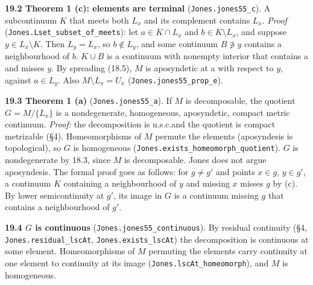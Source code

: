 \documentclass[11pt]{article}
\newcommand{\lean}[1]{\texttt{#1}}
\begin{document}
\textbf{19.2 Theorem 1 (c): elements are terminal} (\lean{Jones.\hspace{0pt}jones55\_\hspace{0pt}c}). A subcontinuum $K$ that meets both $L_x$ and its complement contains $L_x$. \emph{Proof} (\lean{Jones.\hspace{0pt}Lset\_\hspace{0pt}subset\_\hspace{0pt}of\_\hspace{0pt}meets}): let $a \in K \cap L_x$ and $b \in K \setminus L_x$, and suppose $y \in L_x \setminus K$. Then $L_y = L_x$, so $b \notin L_y$, and some continuum $B \not\ni y$ contains a neighbourhood of $b$. $K \cup B$ is a continuum with nonempty interior that contains a and misses $y$. By spreading (18.5), $M$ is aposyndetic at a with respect to $y$, against $a \in L_y$. Also $M \setminus L_x = U_x$ (\lean{Jones.\hspace{0pt}jones55\_\hspace{0pt}prop\_\hspace{0pt}e}).

\textbf{19.3 Theorem 1 (a)} (\lean{Jones.\hspace{0pt}jones55\_\hspace{0pt}a}). If $M$ is decomposable, the quotient $G = M/\{L_x\}$ is a nondegenerate, homogeneous, aposyndetic, compact metric continuum. \emph{Proof:} the decomposition is u.s.c.\@ and the quotient is compact metrizable (\S{}4). Homeomorphisms of $M$ permute the elements (aposyndesis is topological), so $G$ is homogeneous (\lean{Jones.\hspace{0pt}exists\_\hspace{0pt}homeomorph\_\hspace{0pt}quotient}). $G$ is nondegenerate by 18.3, since $M$ is decomposable. Jones does not argue aposyndesis. The formal proof goes as follows: for $g \neq g'$ and points $x \in g$, $y \in g'$, a continuum $K$ containing a neighbourhood of $y$ and missing $x$ misses $g$ by (c). By lower semicontinuity at $g'$, its image in $G$ is a continuum missing $g$ that contains a neighbourhood of $g'$.

\textbf{19.4 $G$ is continuous} (\lean{Jones.\hspace{0pt}jones55\_\hspace{0pt}continuous}). By residual continuity (\S{}4, \lean{Jones.\hspace{0pt}residual\_\hspace{0pt}lscAt}, \lean{Jones.\hspace{0pt}exists\_\hspace{0pt}lscAt}) the decomposition is continuous at some element. Homeomorphisms of $M$ permuting the elements carry continuity at one element to continuity at its image (\lean{Jones.\hspace{0pt}lscAt\_\hspace{0pt}homeomorph}), and $M$ is homogeneous.
\end{document}
